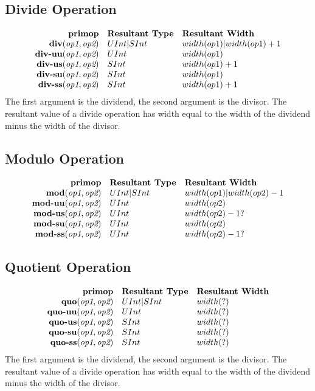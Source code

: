 \documentclass[12pt]{article}
\begin{document}
\subsection{Divide Operation}
\[
\begin{array}{rll}
\text{\bf primop} & \text{\bf Resultant Type} & \text{\bf Resultant Width} \\
\text{\bf div}(   \text{\em op1}, \text{\em op2}) & UInt|SInt & width(op1)|width(op1) + 1  \\
\text{\bf div-uu}(\text{\em op1}, \text{\em op2}) &   UInt & width(op1)     \\
\text{\bf div-us}(\text{\em op1}, \text{\em op2}) &   SInt & width(op1) + 1  \\
\text{\bf div-su}(\text{\em op1}, \text{\em op2}) &   SInt & width(op1)     \\
\text{\bf div-ss}(\text{\em op1}, \text{\em op2}) &   SInt & width(op1) + 1  \\
\end{array}
\]
The first argument is the dividend, the second argument is the divisor.
The resultant value of a divide operation has width equal to the width of the dividend minus the width of the divisor.

\subsection{Modulo Operation}
\[
\begin{array}{rll}
\text{\bf primop} & \text{\bf Resultant Type} & \text{\bf Resultant Width} \\
\text{\bf mod}(   \text{\em op1}, \text{\em op2}) & UInt|SInt & width(op1)|width(op2) - 1  \\
\text{\bf mod-uu}(\text{\em op1}, \text{\em op2}) &   UInt & width(op2)     \\
\text{\bf mod-us}(\text{\em op1}, \text{\em op2}) &   UInt & width(op2) - 1?  \\
\text{\bf mod-su}(\text{\em op1}, \text{\em op2}) &   UInt & width(op2)     \\
\text{\bf mod-ss}(\text{\em op1}, \text{\em op2}) &   UInt & width(op2) - 1?  \\
\end{array}
\]

\subsection{Quotient Operation}
\[
\begin{array}{rll}
\text{\bf primop} & \text{\bf Resultant Type} & \text{\bf Resultant Width} \\
\text{\bf quo}(   \text{\em op1}, \text{\em op2}) & UInt|SInt & width(?)  \\
\text{\bf quo-uu}(\text{\em op1}, \text{\em op2}) &   UInt & width(?)     \\
\text{\bf quo-us}(\text{\em op1}, \text{\em op2}) &   SInt & width(?)   \\
\text{\bf quo-su}(\text{\em op1}, \text{\em op2}) &   SInt & width(?)     \\
\text{\bf quo-ss}(\text{\em op1}, \text{\em op2}) &   SInt & width(?)   \\
\end{array}
\]
The first argument is the dividend, the second argument is the divisor.
The resultant value of a divide operation has width equal to the width of the dividend minus the width of the divisor.
\end{document}
